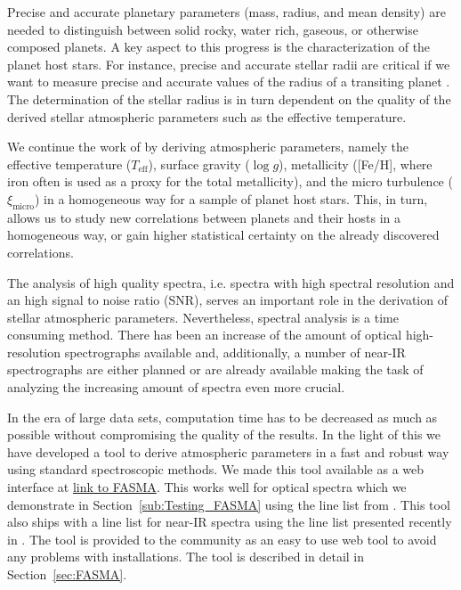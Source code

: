 \documentclass{aa}
\begin{document}
Precise and accurate planetary parameters (mass, radius, and mean density) are
needed to distinguish between solid rocky, water rich, gaseous, or otherwise
composed planets. A key aspect to this progress is the characterization of the
planet host stars. For instance, precise and accurate stellar radii are critical
if we want to measure precise and accurate values of the radius of a transiting
planet \citep[see e.g.][]{Torres2012,Mortier2013}. The determination of the
stellar radius is in turn dependent on the quality of the derived stellar
atmospheric parameters such as the effective temperature.

We continue the work of \citet{Santos13} by deriving atmospheric parameters,
namely the effective temperature ($T_\mathrm{eff}$), surface gravity ($\log g$),
metallicity ([Fe/H], where iron often is used as a proxy for the total
metallicity), and the micro turbulence ($\xi_\mathrm{micro}$) in a homogeneous
way for a sample of planet host stars. This, in turn, allows us to study new
correlations between planets and their hosts in a homogeneous way,  or gain
higher statistical certainty on the already discovered correlations.

The analysis of high quality spectra, i.e. spectra with high spectral resolution
and an high  signal to noise ratio (SNR), serves an important role in the
derivation of stellar atmospheric parameters. Nevertheless, spectral analysis is
a time consuming method. There has been an increase of the amount of  optical
high-resolution spectrographs available and, additionally, a number of near-IR
spectrographs are either planned or are already available making the task of
analyzing the increasing amount of spectra even more crucial.

In the era of large data sets, computation time has to be decreased as much as
possible without compromising the quality of the results. In the light of this
we have developed a tool to derive atmospheric parameters in a fast and robust
way using standard spectroscopic methods. We made this tool available as a web
interface at \url{link to FASMA}. This works well for optical spectra which we
demonstrate in Section~\ref{sub:Testing_FASMA} using the line list from
\citet{Sousa2011}. This tool also ships with a line list for near-IR spectra
using the line list presented recently in \citet{Andreasen2016}. The tool is
provided to the community as an easy to use web tool to avoid any problems with
installations. The tool is described in detail in Section~\ref{sec:FASMA}.
\end{document}
